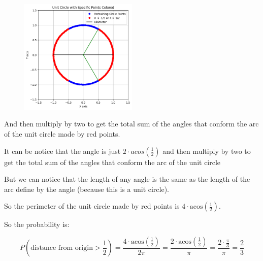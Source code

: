 \begin{figure}[H]
    \centering
    \includegraphics[width=0.5\textwidth]{images/unit-circle-angle.png}
\end{figure}

And then multiply by two to get the total sum of the angles that conform the
arc of the unit circle made by red points.

It can be notice that the angle is just $2 \cdot acos(\frac{1}{2})$ and then multiply
by two to get the total sum of the angles that conform the arc of the unit circle

But we can notice that the length of any angle is the same as the length of the arc define by the angle (because this is a
unit circle).

So the perimeter of the unit circle made by red points is $4 \cdot \text{acos}(\frac{1}{2})$.

So the probability is:

\begin{equation*}
    P( \text{distance from origin} > \frac{1}{2} ) = \frac{4 \cdot \text{acos}(\frac{1}{2})}{2\pi} = \frac{2 \cdot \text{acos}(\frac{1}{2})}{\pi} = \frac{2 \cdot \frac{\pi}{3}}{\pi} = \frac{2}{3}
\end{equation*}
